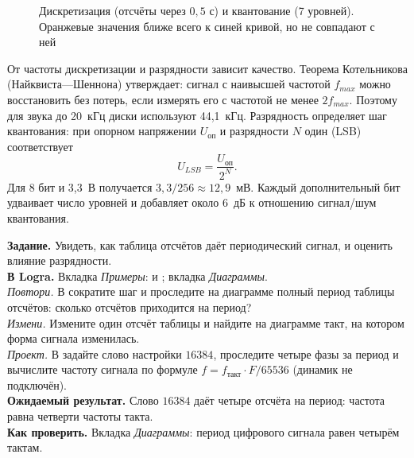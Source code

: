 \begin{figure}[H]
\centering
{}
\caption{Дискретизация (отсчёты через $0{,}5$ с) и квантование (7 уровней). Оранжевые значения ближе всего к синей кривой, но не совпадают с ней}
\end{figure}

От частоты дискретизации и разрядности зависит качество. Теорема
Котельникова (Найквиста---Шеннона) утверждает: сигнал с наивысшей частотой
$f_{max}$ можно восстановить без потерь, если измерять его с частотой
не менее $2 f_{max}$. Поэтому для звука до 20~кГц диски используют
44,1~кГц. Разрядность определяет шаг квантования: при опорном напряжении
$U_{\text{оп}}$ и разрядности $N$ один  (LSB) соответствует
\[
U_{LSB} = \frac{U_{\text{оп}}}{2^N}.
\]
Для 8 бит и 3,3~В получается $3{,}3/256 \approx 12{,}9$~мВ. Каждый
дополнительный бит удваивает число уровней и добавляет около 6~дБ к
отношению сигнал/шум квантования.

\begin{diybox}
\textbf{Задание.} Увидеть, как таблица отсчётов даёт периодический сигнал, и
оценить влияние разрядности.\\
\textbf{В Logra.} Вкладка \emph{Примеры}:  и
; вкладка \emph{Диаграммы}.\\
 \emph{Повтори.} В  сократите шаг и проследите на
диаграмме полный период таблицы отсчётов: сколько отсчётов приходится на
период?\\
 \emph{Измени.} Измените один отсчёт таблицы и найдите на диаграмме
такт, на котором форма сигнала изменилась.\\
 \emph{Проект.} В  задайте слово настройки
$16384$, проследите четыре фазы за период и вычислите частоту сигнала по
формуле $f = f_\text{такт}\cdot F/65536$ (динамик не подключён).\\
\textbf{Ожидаемый результат.} Слово $16384$ даёт четыре отсчёта на период:
частота равна четверти частоты такта.\\
\textbf{Как проверить.} Вкладка \emph{Диаграммы}: период цифрового сигнала
равен четырём тактам.
\end{diybox}

